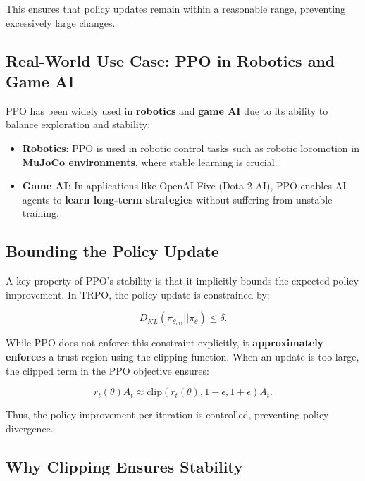 \documentclass[12pt]{extreport} %
\begin{document}
This ensures that policy updates remain within a reasonable range, preventing excessively large changes.

\subsection{\textbf{Real-World Use Case: PPO in Robotics and Game AI}}

PPO has been widely used in \textbf{robotics} and \textbf{game AI} due to its ability to balance exploration and stability:

\begin{itemize}
    \item \textbf{Robotics}: PPO is used in robotic control tasks such as robotic locomotion in \textbf{MuJoCo environments}, where stable learning is crucial.
    \item \textbf{Game AI}: In applications like OpenAI Five (Dota 2 AI), PPO enables AI agents to \textbf{learn long-term strategies} without suffering from unstable training.
\end{itemize}

\subsection{\textbf{Bounding the Policy Update}}

A key property of PPO's stability is that it implicitly bounds the expected policy improvement. In TRPO, the policy update is constrained by:

\begin{equation}
D_{KL}(\pi_{\theta_{\text{old}}} || \pi_{\theta}) \leq \delta.
\end{equation}

While PPO does not enforce this constraint explicitly, it \textbf{approximately enforces} a trust region using the clipping function. When an update is too large, the clipped term in the PPO objective ensures:

\begin{equation}
r_t(\theta) A_t \approx \text{clip}(r_t(\theta), 1-\epsilon, 1+\epsilon) A_t.
\end{equation}

Thus, the policy improvement per iteration is controlled, preventing policy divergence.

\subsection{\textbf{Why Clipping Ensures Stability}}
\end{document}
